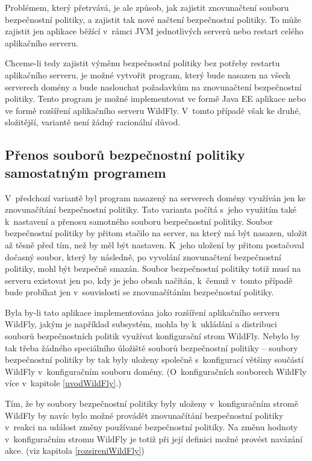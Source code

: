 Problémem, který přetrvává, je ale způsob, jak zajistit znovunačtení souboru bezpečnostní politiky, a zajistit tak nové načtení bezpečnostní politiky.
To může zajistit jen aplikace běžící v~rámci JVM jednotlivých serverů nebo restart celého aplikačního serveru.

Chceme-li tedy zajistit výměnu bezpečnostní politiky bez potřeby restartu aplikačního serveru, je možné vytvořit program,
který bude nasazen na všech serverech domény a bude naslouchat požadavkům na znovunačtení bezpečnostní politiky.
Tento program je možné implementovat ve formě Java EE aplikace nebo ve formě rozšíření aplikačního serveru WildFly.
V~tomto případě však ke druhé, složitější, variantě není žádný racionální důvod.

\subsection{Přenos souborů bezpečnostní politiky samostatným programem} \label{reseniProgramem}

V~předchozí variantě byl program nasazený na serverech domény využíván jen ke znovunačítání bezpečnostní politiky.
Tato varianta počítá s~jeho využitím také k~nastavení a přenosu samotného souboru bezpečnostní politiky.
Soubor bezpečnostní politiky by přitom stačilo na server, na který má být nasazen, uložit až těsně před tím, než by měl být nastaven.
K~jeho uložení by přitom postačoval dočasný soubor, který by následně, po vyvolání znovunačtení bezpečnostní politiky, mohl být bezpečně smazán.
Soubor bezpečnostní politiky totiž musí na serveru existovat jen po, kdy je jeho obsah načítán,
k~čemuž v~tomto případě bude probíhat jen v~souvislosti se znovunačítáním bezpečnostní politiky.

Byla by-li tato aplikace implementována jako rozšíření aplikačního serveru WildFly, jakým je například subsystém,
mohla by k~ukládání a distribuci souborů bezpečnostních politik využívat konfigurační strom WildFly.
Nebylo by tak třeba žádného speciálního úložiště souborů bezpečnostní politiky -- soubory bezpečnostní politiky
by tak byly uloženy společně s~konfigurací většiny součástí WildFly v~konfiguračním souboru domény.
(O~konfiguračních souborech WildFly více v~kapitole \ref{uvodWildFly}.)

Tím, že by soubory bezpečnostní politiky byly uloženy v~konfiguračním stromě WildFly by navíc bylo možné provádět znovunačítání
bezpečnostní politiky v~reakci na událost změny používané bezpečnostní politiky.
Na změnu hodnoty v~konfiguračním stromu WildFly je totiž při její definici možné provést navázání akce. (viz kapitola \ref{rozsireniWildFly})

